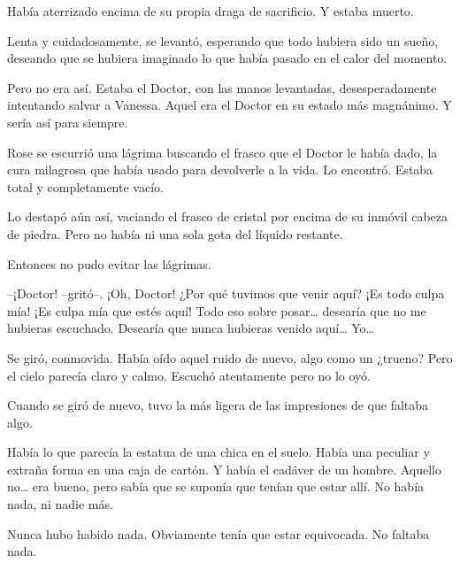 Había aterrizado encima de su propia draga de sacrificio. Y estaba
muerto.

Lenta y cuidadosamente, se levantó, esperando que todo hubiera sido un
sueño, deseando que se hubiera imaginado lo que había pasado en el calor
del momento.

Pero no era así. Estaba el Doctor, con las manos levantadas,
desesperadamente intentando salvar a Vanessa. Aquel era el Doctor en su
estado más magnánimo. Y sería así para siempre.

Rose se escurrió una lágrima buscando el frasco que el Doctor le había
dado, la cura milagrosa que había usado para devolverle a la vida. Lo
encontró. Estaba total y completamente vacío.

Lo destapó aún así, vaciando el frasco de cristal por encima de su
inmóvil cabeza de piedra. Pero no había ni una sola gota del líquido
restante.

Entonces no pudo evitar las lágrimas.

--¡Doctor! --gritó--. ¡Oh, Doctor! ¿Por qué tuvimos que venir aquí? ¡Es
todo culpa mía! ¡Es culpa mía que estés aquí! Todo eso sobre
posar\ldots{} desearía que no me hubieras escuchado. Desearía que nunca
hubieras venido aquí\ldots{} Yo\ldots{}

Se giró, conmovida. Había oído aquel ruido de nuevo, algo como un
¿trueno? Pero el cielo parecía claro y calmo. Escuchó atentamente pero
no lo oyó.

Cuando se giró de nuevo, tuvo la más ligera de las impresiones de que
faltaba algo.

Había lo que parecía la estatua de una chica en el suelo. Había una
peculiar y extraña forma en una caja de cartón. Y había el cadáver de un
hombre. Aquello no\ldots{} era bueno, pero sabía que se suponía que
tenían que estar allí. No había nada, ni nadie más.

Nunca hubo habido nada. Obviamente tenía que estar equivocada. No
faltaba nada.